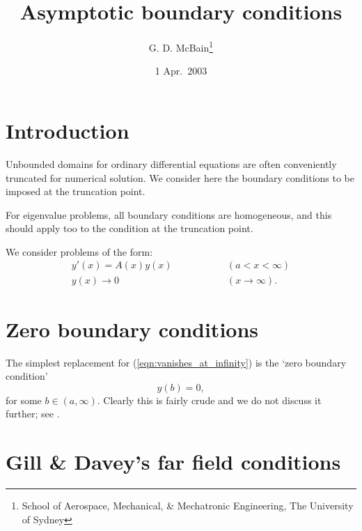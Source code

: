 \documentclass{article}
\begin{document}
\title{Asymptotic boundary conditions}

\author{G. D. McBain\thanks{School of Aerospace, Mechanical, \&
    Mechatronic Engineering, The University of Sydney}}

\date{1 Apr.\ 2003} \maketitle

\section{Introduction}

Unbounded domains for ordinary differential equations are often
conveniently truncated for numerical solution.  We consider here the
boundary conditions to be imposed at the truncation point.

For eigenvalue problems, all boundary conditions are homogeneous, and
this should apply too to the condition at the truncation point.

We consider problems of the form:
\begin{eqnarray}
y'(x)  =   A(x) y(x) & \qquad\qquad & (a < x < \infty) 
\label{eqn:ode} \\
y(x)  \rightarrow  0 & \qquad\qquad & (x\rightarrow\infty).
\label{eqn:vanishes_at_infinity}
\end{eqnarray}

\section{Zero boundary conditions}

The simplest replacement for (\ref{eqn:vanishes_at_infinity}) is the
`zero boundary condition'
\begin{equation}
y(b) = 0,
\end{equation}
for some $b\in (a,\infty)$.  Clearly this is fairly crude and we do
not discuss it further; see \citet[pp.~91--92]{Fox90:NST}.

\section{Gill \& Davey's far field conditions}
\label{sec:Gill}
\end{document}
